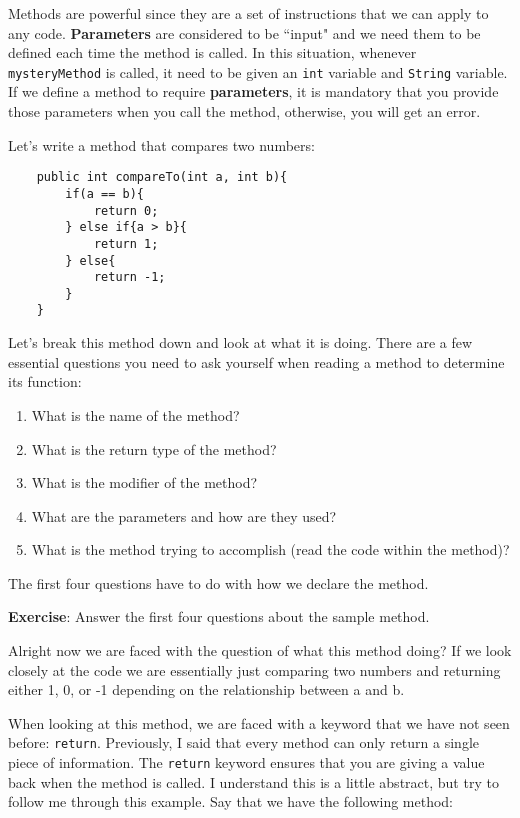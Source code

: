 \documentclass[11pt,fleqn]{article}
\begin{document}
Methods are powerful since they are a set of instructions that we can apply to
any code. \textbf{Parameters} are considered to be ``input" and we need them to
be defined each time the method is called. In this situation, whenever
\texttt{mysteryMethod} is called, it need to be given an \texttt{int} variable
and \texttt{String} variable. If we define a method to require
\textbf{parameters}, it is mandatory that you provide those parameters when you
call the method, otherwise, you will get an error. 

Let's write a method that compares two numbers:

\begin{verbatim}
    public int compareTo(int a, int b){
        if(a == b){
            return 0;
        } else if{a > b}{
            return 1;
        } else{
            return -1;
        }
    }
\end{verbatim}

Let's break this method down and look at what it is doing. There are a few
essential questions you need to ask yourself when reading a method to determine
its function:

\begin{enumerate}[1.]
\item
What is the name of the method?

\item
What is the return type of the method?

\item
What is the modifier of the method?

\item
What are the parameters and how are they used?

\item
What is the method trying to accomplish (read the code within the method)?
\end{enumerate} 

The first four questions have to do with how we declare the method.

\textbf{Exercise}: Answer the first four questions about the sample method.

Alright now we are faced with the question of what  this method doing? If
we look closely at the code we are essentially just comparing two numbers and
returning either 1, 0, or -1 depending on the relationship between a and b.

When looking at this method, we are faced with a keyword that we have not seen
before: \texttt{return}. Previously, I said that every method can only return a
single piece of information. The \texttt{return} keyword ensures that you are
giving a value back when the method is called. I understand this is a little
abstract, but try to follow me through this example. Say that we have the
following method:
\end{document}
